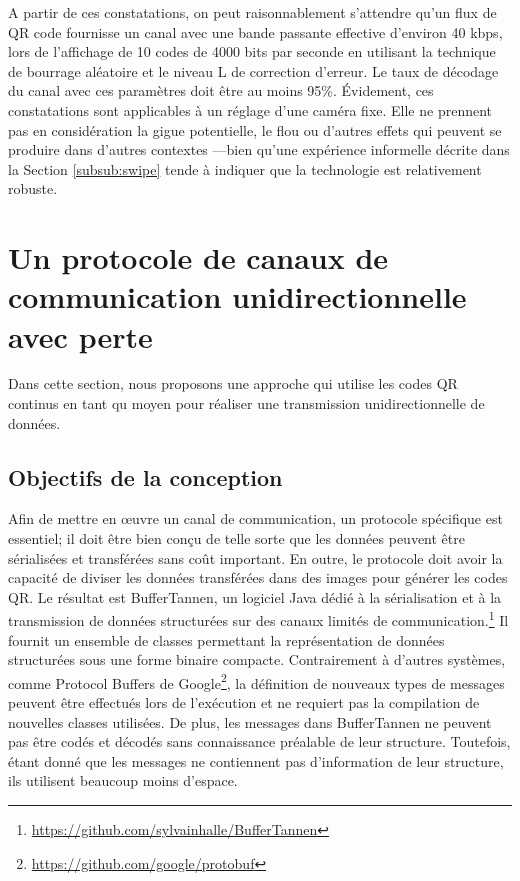 A partir de ces constatations, on peut raisonnablement s'attendre qu'un flux de QR code fournisse un canal avec une bande passante effective d'environ 40 kbps, lors de l'affichage de 10 codes de 4000 bits par seconde en utilisant la technique de bourrage aléatoire et le niveau L de correction d'erreur. Le taux de décodage du canal avec ces paramètres doit être au moins 95\%. Évidement, ces constatations sont applicables à un réglage d'une caméra fixe. Elle ne prennent pas en considération la gigue potentielle, le flou ou d'autres effets qui peuvent se produire dans d'autres contextes ---bien qu'une expérience informelle décrite dans la Section \ref{subsub:swipe} tende à indiquer que la technologie est relativement robuste.


\section{Un protocole de canaux de communication unidirectionnelle avec perte}\label{sec:qr:protocol} %

Dans cette section, nous proposons une approche qui utilise les codes QR continus en tant qu moyen pour réaliser une transmission unidirectionnelle de données.

\subsection{Objectifs de la conception}

Afin de mettre en \oe{}uvre un canal de communication, un protocole spécifique est essentiel; il doit être bien conçu de telle sorte que les données peuvent être sérialisées et transférées sans coût important. En outre, le protocole doit avoir la capacité de diviser les données transférées dans des images pour générer les codes QR. Le résultat est BufferTannen, un logiciel Java dédié à la sérialisation et à la transmission de données structurées sur des canaux limités de communication.\footnote{\url{https://github.com/sylvainhalle/BufferTannen}} Il fournit un ensemble de classes permettant la représentation de données structurées sous une forme binaire compacte. Contrairement à d'autres systèmes, comme Protocol Buffers de Google\footnote{\url{https://github.com/google/protobuf}}, la définition de nouveaux types de messages peuvent être effectués lors de l'exécution et ne requiert pas la compilation de nouvelles classes utilisées. De plus, les messages dans BufferTannen ne peuvent pas être codés et décodés sans connaissance préalable de leur structure. Toutefois, étant donné que les messages ne contiennent pas d'information de leur structure, ils utilisent beaucoup moins d'espace.

